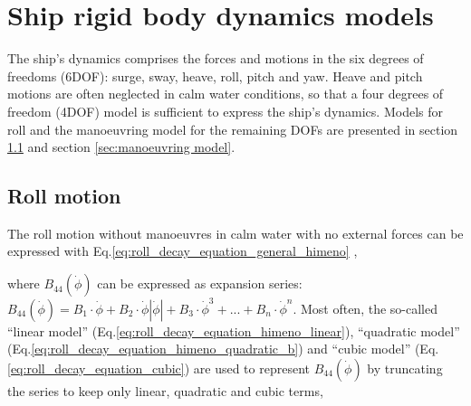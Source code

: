 \chapter{Ship rigid body dynamics models}
\label{ch:models}

The ship's dynamics comprises the forces and motions in the six degrees of freedoms (6DOF): surge, sway, heave, roll, pitch and yaw. Heave and pitch motions are often neglected in calm water conditions, so that a four degrees of freedom (4DOF) model is sufficient to express the ship's dynamics. Models for roll and the manoeuvring model for the remaining DOFs are presented in section \ref{sec:roll} and section \ref{sec:manoeuvring model}. 

\section{Roll motion} \label{sec:roll}

The roll motion without manoeuvres in calm water with no external forces can be expressed with Eq.\ref{eq:roll_decay_equation_general_himeno} \cite{himeno_prediction_1981},


\noindent where $B_{44}\left(\dot{\phi}\right)$ can be expressed as expansion series:  
$ B_{44}\left(\dot{\phi}\right) = B_1\cdot\dot{\phi} + B_2\cdot\dot{\phi}\left|\dot{\phi}\right| + B_3\cdot\dot{\phi}^3 + ... + B_n\cdot\dot{\phi}^n$. Most often, the so-called ``linear model'' (Eq.\ref{eq:roll_decay_equation_himeno_linear}), ``quadratic model'' (Eq.\ref{eq:roll_decay_equation_himeno_quadratic_b}) and ``cubic model'' (Eq.\ref{eq:roll_decay_equation_cubic}) are used to represent $B_{44}(\dot{\phi})$ by truncating the series to keep only linear, quadratic and cubic terms,






